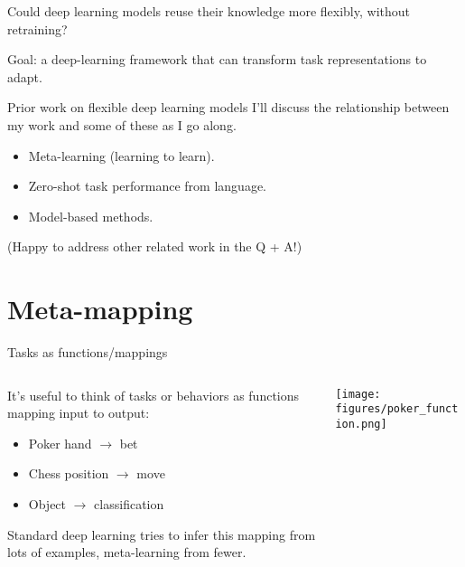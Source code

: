 \documentclass{beamer}
\begin{document}
\begin{frame}[standout]
Could deep learning models reuse their knowledge more flexibly, without retraining?
\end{frame}


\begin{frame}[standout]
Goal: a deep-learning framework that can transform task representations to adapt.
\end{frame}

\begin{frame}{Prior work on flexible deep learning models}
I'll discuss the relationship between my work and some of these as I go along.
\begin{itemize}
    \item Meta-learning (learning to learn).
    \item Zero-shot task performance from language.
    \item Model-based methods. 
\end{itemize}
(Happy to address other related work in the Q + A!)
\end{frame}

\section{Meta-mapping}

\begin{frame}{Tasks as functions/mappings}
\begin{columns}
\begin{column}{0.5\textwidth}
It's useful to think of tasks or behaviors as functions mapping input to output:
\begin{itemize}
    \item Poker hand \(\rightarrow\) bet
    \item Chess position \(\rightarrow\) move
    \item Object \(\rightarrow\) classification
\end{itemize}
Standard deep learning tries to infer this mapping from lots of examples, meta-learning from fewer. 
\end{column}

\begin{column}{0.5\textwidth}
\texttt{[image: figures/poker\_function.png]}
\end{column}
\end{columns}
\end{frame}
\end{document}
